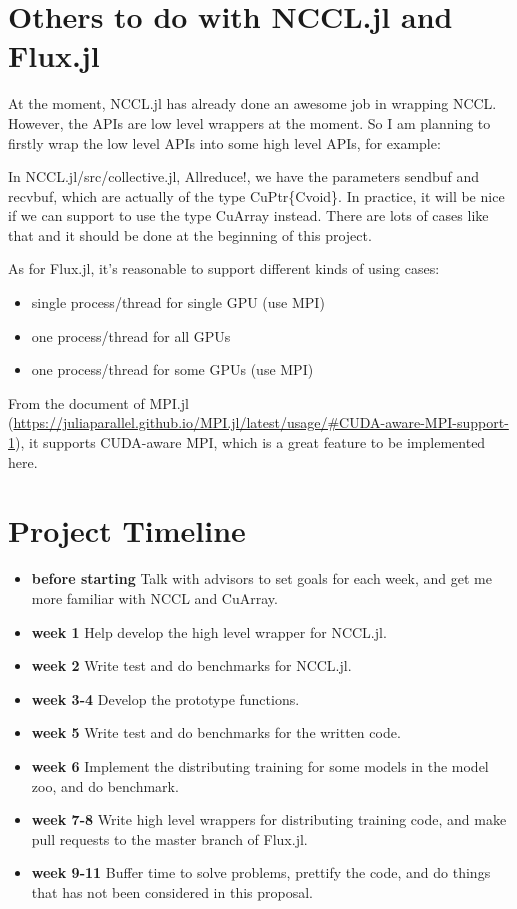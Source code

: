 \documentclass[12pt]{extarticle}
\begin{document}
\newpage
\section{Others to do with NCCL.jl and Flux.jl}

At the moment, NCCL.jl has already done an awesome job in wrapping NCCL. However, the APIs are low level wrappers at the moment.
So I am planning to firstly wrap the low level APIs into some high level APIs, for example:

In NCCL.jl/src/collective.jl, Allreduce!, we have the parameters sendbuf and recvbuf, which are actually of the type CuPtr\{Cvoid\}.
In practice, it will be nice if we can support to use the type CuArray instead. There are lots of cases like that and it should be done at the
beginning of this project.

As for Flux.jl, it's reasonable to support different kinds of using cases:
\begin{itemize}
    \item single process/thread for single GPU (use MPI)
    \item one process/thread for all GPUs 
    \item one process/thread for some GPUs (use MPI)
\end{itemize}

From the document of MPI.jl (\url{https://juliaparallel.github.io/MPI.jl/latest/usage/#CUDA-aware-MPI-support-1}), it supports CUDA-aware MPI, which is a great feature to be implemented here.


\section{Project Timeline}
\begin{itemize}
    \item{\textbf{before starting}} Talk with advisors to set goals for each week, and get me more familiar with NCCL and CuArray.
    \item{\textbf{week 1}} Help develop the high level wrapper for NCCL.jl.
    \item{\textbf{week 2}} Write test and do benchmarks for NCCL.jl.
    \item{\textbf{week 3-4}} Develop the prototype functions.
    \item{\textbf{week 5}} Write test and do benchmarks for the written code.
    \item{\textbf{week 6}} Implement the distributing training for some models in the model zoo, and do benchmark.
    \item{\textbf{week 7-8}} Write high level wrappers for distributing training code, and make pull requests to the master branch of Flux.jl.
    \item{\textbf{week 9-11}} Buffer time to solve problems, prettify the code, and do things that has not been considered in this proposal.
\end{itemize}
\end{document}
